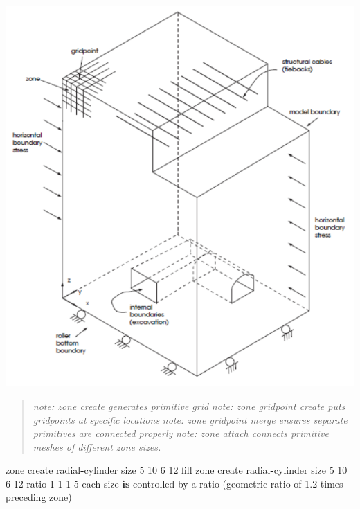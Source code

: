 \documentclass[a4paper, nobind]{templates/ociamthesis}
\newenvironment{Shaded}{\begin{snugshade}}{\end{snugshade}}
\newcommand{\DecValTok}[1]{\textcolor[rgb]{0.00,0.00,0.81}{#1}}
\newcommand{\FloatTok}[1]{\textcolor[rgb]{0.00,0.00,0.81}{#1}}
\newcommand{\KeywordTok}[1]{\textcolor[rgb]{0.13,0.29,0.53}{\textbf{#1}}}
\newcommand{\NormalTok}[1]{#1}
\newcommand{\OperatorTok}[1]{\textcolor[rgb]{0.81,0.36,0.00}{\textbf{#1}}}
\renewenvironment{Shaded}
{
  \vspace{10pt}%
  \begin{snugshade}%
}{%
  \end{snugshade}%
  \vspace{8pt}%
}
\begin{document}
\includegraphics[width=1\linewidth]{myfigureeeeee/example-FLAC3D-Model}

\begin{quote}
\emph{note: zone create generates primitive grid}
\emph{note: zone gridpoint create puts gridpoints at specific locations}
\emph{note: zone gridpoint merge ensures separate primitives are connected properly}
\emph{note: zone attach connects primitive meshes of different zone sizes.}
\end{quote}

\begin{Shaded}
\begin{Highlighting}[]
\NormalTok{zone create radial}\OperatorTok{{-}}\NormalTok{cylinder size }\DecValTok{5} \DecValTok{10} \DecValTok{6} \DecValTok{12}\NormalTok{ fill}
\NormalTok{zone create radial}\OperatorTok{{-}}\NormalTok{cylinder size }\DecValTok{5} \DecValTok{10} \DecValTok{6} \DecValTok{12}\NormalTok{ ratio }\DecValTok{1} \DecValTok{1} \DecValTok{1} \DecValTok{5}
\NormalTok{each size }\KeywordTok{is}\NormalTok{ controlled by a ratio (geometric ratio of }\FloatTok{1.2}\NormalTok{ times preceding zone)}
\end{Highlighting}
\end{Shaded}
\end{document}
